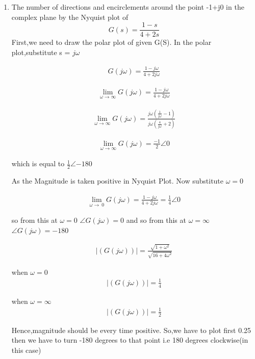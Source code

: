 \begin{enumerate}[label=\thesection.\arabic*.,ref=\thesection.\theenumi]
\item The number of directions and encirclements around the point -1+j0 in the complex plane by the Nyquist plot of $$G(s) = \frac{1-s}{4+2s}$$
\bigskip
\solution
First,we need to draw the polar plot of given G(S).
In the polar plot,substitute s = $j\omega$

\begin{align}
G(j\omega) = \frac{1-j\omega}{4+2j\omega} 
\end{align}

\begin{align}
\lim_{\omega\to\infty} G(j\omega) = \frac{1-j\omega}{4+2j\omega} 
\end{align}

\begin{align}
\lim_{\omega\to\infty} G(j\omega) = \frac{j\omega(\frac{1}{j\omega}-1)}{j\omega(\frac{4}{j\omega}+2)}  
\end{align}

\begin{align}
\lim_{\omega\to\infty} G(j\omega) = \frac{-1}{2}\angle 0  
\end{align}

which is equal to $\frac{1}{2}\angle{-180}$

As the Magnitude is taken positive in Nyquist Plot.
Now substitute $\omega = 0$

\begin{align}
\lim_{\omega\to\ 0} G(j\omega) = \frac{1-j\omega}{4+2j\omega} = \frac{1}{4}\angle 0 
\end{align}

so from this  at $\omega = 0$ $\angle G(j\omega) = 0$
and so from this  at $\omega = \infty$ $\angle G(j\omega)  =-180$     


\begin{align}
\mid(G(j\omega))\mid = \frac{\sqrt{1+{\omega}^2}}{\sqrt{16+{4\omega}^2}} 
\end{align}

when $\omega = 0$
\begin{align}
\mid(G(j\omega))\mid = \frac{1}{4}
\end{align}

when $\omega = \infty$
\begin{align}
\mid(G(j\omega))\mid = \frac{1}{2}
\end{align}


Hence,magnitude should be every time positive.
So,we have to plot first 0.25 then we have to turn {-180} degrees to that point i.e {180} degrees clockwise(in this case)
\bigskip


\end{enumerate}
